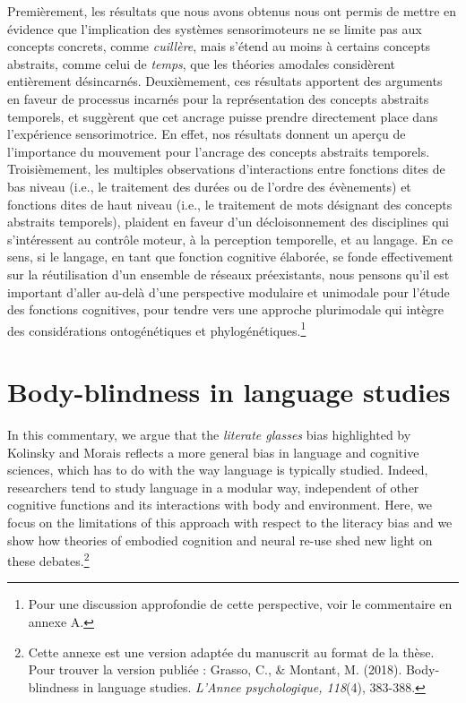 \documentclass[
  a4paper,12pt,twoside,onecolumn,openright,final,oldfontcommands]{memoir}
\newcommand{\initial}[1]{
	\lettrine[lines=3,lhang=0.33,nindent=0em]{
		\color{gray}
     		{\textsc{#1}}}{}}
\begin{document}
Premièrement, les résultats que nous avons obtenus nous ont permis de mettre en évidence que l'implication des systèmes sensorimoteurs ne se limite pas aux concepts concrets, comme \emph{cuillère}, mais s'étend au moins à certains concepts abstraits, comme celui de \emph{temps}, que les théories amodales considèrent entièrement désincarnés. Deuxièmement, ces résultats apportent des arguments en faveur de processus incarnés pour la représentation des concepts abstraits temporels, et suggèrent que cet ancrage puisse prendre directement place dans l'expérience sensorimotrice. En effet, nos résultats donnent un aperçu de l'importance du mouvement pour l'ancrage des concepts abstraits temporels. Troisièmement, les multiples observations d'interactions entre fonctions dites de bas niveau (i.e., le traitement des durées ou de l'ordre des évènements) et fonctions dites de haut niveau (i.e., le traitement de mots désignant des concepts abstraits temporels), plaident en faveur d'un décloisonnement des disciplines qui s'intéressent au contrôle moteur, à la perception temporelle, et au langage. En ce sens, si le langage, en tant que fonction cognitive élaborée, se fonde effectivement sur la réutilisation d'un ensemble de réseaux préexistants, nous pensons qu'il est important d'aller au-delà d'une perspective modulaire et unimodale pour l'étude des fonctions cognitives, pour tendre vers une approche plurimodale qui intègre des considérations ontogénétiques et phylogénétiques.\footnote{Pour une discussion approfondie de cette perspective, voir le commentaire en annexe A.}

\hypertarget{appendix-appendix}{%
\appendix {}}


\hypertarget{appendix1}{%
\chapter{Body-blindness in language studies}\label{appendix1}}

\initial{I}n this commentary, we argue that the \emph{literate glasses} bias highlighted by Kolinsky and Morais reflects a more general bias in language and cognitive sciences, which has to do with the way language is typically studied. Indeed, researchers tend to study language in a modular way, independent of other cognitive functions and its interactions with body and environment. Here, we focus on the limitations of this approach with respect to the literacy bias and we show how theories of embodied cognition and neural re-use shed new light on these debates.\footnote{ Cette annexe est une version adaptée du manuscrit au format de la thèse. Pour trouver la version publiée : Grasso, C., \& Montant, M. (2018). Body-blindness in language studies. \emph{L'Annee psychologique, 118}(4), 383-388.}
\end{document}
